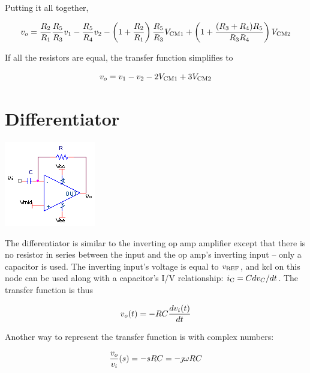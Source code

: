 \noindent Putting it all together,

\textcolor{red}{
\begin{equation}
\vout = \frac{R_2}{R_1}\frac{R_5}{R_3}v_1 - \frac{R_5}{R_4}v_2 - \left(1+\frac{R_2}{R_1}\right)\frac{R_5}{R_3}V\sub{CM1} + \left(1+\frac{(R_3+R_4)R_5}{R_3R_4}\right)V\sub{CM2}
\label{eq:highcmdifferenceamplifier}
\end{equation}
}

\noindent If all the resistors are equal, the transfer function simplifies to

\textcolor{red}{
\begin{equation}
\vout = v_1-v_2-2V\sub{CM1}+3V\sub{CM2}
\label{eq:highcmdifferenceamplifier_simple}
\end{equation}
}

\section{Differentiator}
\begin{center}
	\includegraphics{schematics/differentiator.PNG}
\end{center}
The differentiator is similar to the inverting op amp amplifier except that there is no resistor in series between the input and the op amp's inverting input -- only a capacitor is used.
The inverting input's voltage is equal to $v_\mathrm{REF}$, and \ac{kcl} on this node can be used along with a capacitor's I/V relationship: $i_\mathrm{C} = Cdv_C/dt$. The transfer function is thus

\textcolor{red}{
\begin{equation}
\vout(t) = -RC\frac{d\vin(t)}{dt}
\label{differentiator}
\end{equation}
}

\noindent Another way to represent the transfer function is with complex numbers:

\textcolor{red}{
\begin{equation}
\frac{\vout}{\vin}(s) = -sRC = -\jmath \omega RC
\label{eq:differentiator_complex}
\end{equation}
}

